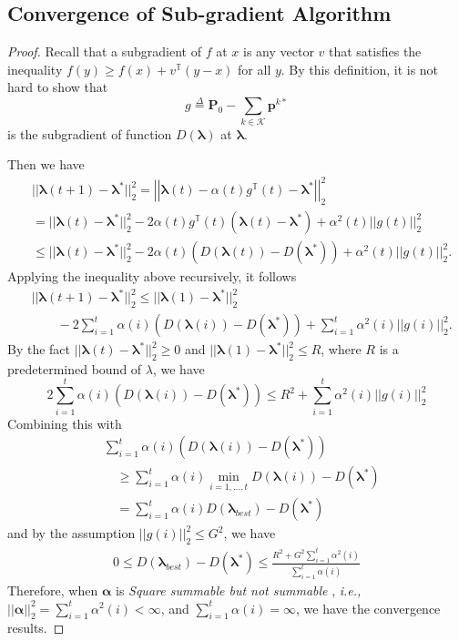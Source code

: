 \documentclass[conference]{IEEEtran}
\newcommand{\mdef}{\overset{\Delta}{=}}
\newcommand{\ie}{\emph{i.e., }}
\newcommand{\mk}{\mathcal{K}}
\newcommand{\transpose}{^{\mathbb{T}}}
\newcommand{\bb}{\boldsymbol}
\begin{document}
\subsection{Convergence of Sub-gradient Algorithm}
\begin{proof}
Recall that a subgradient of $f$ at $x$ is any vector $v$ that satisfies the inequality $f(y)\ge f(x) + v\transpose (y-x)$ for all $y$. By this definition, it is not hard to show that
$$g\mdef \bb{P}_0-\sum_{k\in\mk}\bb{p}^{k*}$$
is the subgradient of function $D(\bb{\lambda})$ at $\bb{\lambda}$.

Then we have
\begin{align*}
&||{\bb\lambda}(t+1)-{\bb\lambda^*}||_2^2=\left|\left|\bb{\lambda}(t)-\alpha(t)g\transpose(t)-{\bb\lambda^*}\right|\right|_2^2\\
&=||\bb{\lambda}(t)-{\bb\lambda^*}||_2^2-2\alpha(t)g\transpose(t)\left(\bb{\lambda}(t)-{\bb\lambda^*}\right)+\alpha^2(t)\left|\left|g(t)\right|\right|_2^2\\
&\le ||\bb{\lambda}(t)-{\bb\lambda^*}||_2^2-2\alpha(t)\left(D(\bb{\lambda}(t))-D(\bb{\lambda}^*)\right)+\alpha^2(t)\left|\left|g(t)\right|\right|_2^2.\label{eq:sub_gradiant_1}
\end{align*}
Applying the inequality above recursively, it follows
\begin{align*}
& ||{\bb\lambda}(t+1)-{\bb\lambda^*}||_2^2\le||\bb{\lambda}(1)-{\bb\lambda^*}||_2^2\\
&\quad\quad-2\sum_{i=1}^t\alpha(i)\left(D(\bb{\lambda}(i))-D(\bb{\lambda}^*)\right)+\sum_{i=1}^t\alpha^2(i)\left|\left|g(i)\right|\right|_2^2.
\end{align*}
By the fact $||\bb{\lambda}(t)-{\bb\lambda^*}||_2^2\ge 0 $ and $||\bb{\lambda}(1)-{\bb\lambda^*}||_2^2\le R$, where $R$ is a predetermined bound of $\lambda$, we have
\begin{equation*}
2\sum_{i=1}^t\alpha(i)\left(D(\bb{\lambda}(i))-D(\bb{\lambda}^*)\right)\le R^2+\sum_{i=1}^t\alpha^2(i)\left|\left|g(i)\right|\right|_2^2
\end{equation*}
Combining this with
\begin{align*}
&\sum_{i=1}^t\alpha(i)\left(D(\bb{\lambda}(i))-D(\bb{\lambda}^*)\right)\\
&\quad\ge \sum_{i=1}^t\alpha(i)\min_{i=1,\dots,t}D(\bb{\lambda}(i))-D(\bb{\lambda}^*)\\
&\quad= \sum_{i=1}^t\alpha(i) D(\bb{\lambda}_{best})-D(\bb{\lambda}^*)
\end{align*}
and by the assumption $\left|\left|g(i)\right|\right|_2^2\le G^2$, we have
\begin{align}
\label{eq:sub_gradient_ineq}
0\le D(\bb{\lambda}_{best})-D(\bb{\lambda}^*)\le \frac{R^2+G^2\sum_{i=1}^{t}\alpha^2(i)}{\sum_{i=1}^{t}\alpha(i)}
\end{align}
Therefore, when $\bb{\alpha}$ is \emph{Square summable but not summable} , \ie
$\left|\left|\bb{\alpha}\right|\right|_2^2=\sum_{i=1}^t \alpha^2(i) <\infty$, and $\sum_{i=1}^t \alpha(i)= \infty$, we have the convergence results.
\end{proof}
\end{document}
